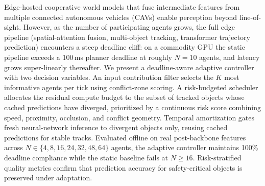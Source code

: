 Edge-hosted cooperative world models that fuse intermediate features from
multiple connected autonomous vehicles (CAVs) enable perception beyond
line-of-sight. However, as the number of participating agents grows, the
full edge pipeline (spatial-attention fusion, multi-object tracking,
transformer trajectory prediction) encounters a steep deadline cliff:
on a commodity GPU the static pipeline exceeds a 100\,ms planner
deadline at roughly $N=10$ agents, and latency grows super-linearly
thereafter.  We present a deadline-aware adaptive controller with two
decision variables.  An input contribution filter selects the $K$ most
informative agents per tick using conflict-zone scoring. A risk-budgeted
scheduler allocates the residual compute budget to the subset of tracked
objects whose cached predictions have diverged, prioritized by a
continuous risk score combining speed, proximity, occlusion, and
conflict geometry.  Temporal amortization gates fresh neural-network
inference to divergent objects only, reusing cached predictions for
stable tracks.  Evaluated offline on real post-backbone features across
$N \in \{4, 8, 16, 24, 32, 48, 64\}$ agents, the adaptive controller
maintains 100\% deadline compliance while the static baseline fails at
$N \geq 16$.  Risk-stratified quality metrics confirm that prediction
accuracy for safety-critical objects is preserved under adaptation.
